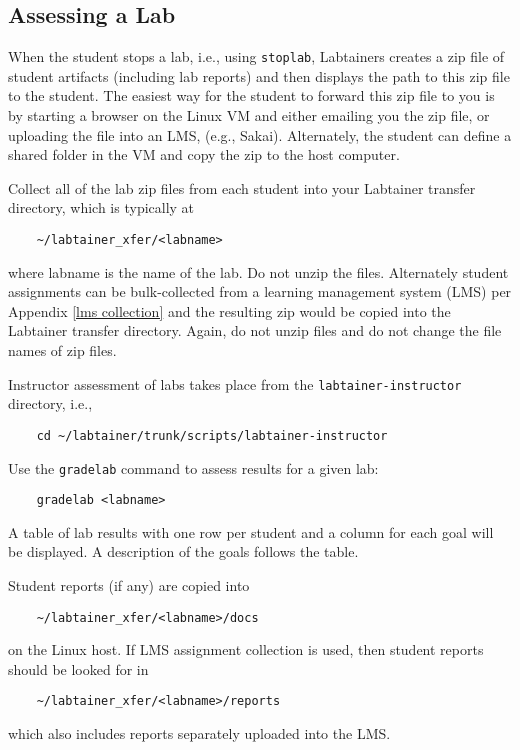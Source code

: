 \documentclass[12pt]{article}
\begin{document}
\subsection{Assessing a Lab}
When the student stops a lab, i.e., using {\tt stoplab}, Labtainers creates a zip file of
student artifacts (including lab reports) and then displays the path to this zip file to
the student.  The easiest way for the student to forward this zip file to you is by starting
a browser on the Linux VM and either emailing you the zip file, or uploading the file
into an LMS, (e.g., Sakai).  Alternately, the student can define a shared folder in the VM
and copy the zip to the host computer.

Collect all of the lab zip files from each student into your Labtainer transfer directory, which
is typically at
\begin{verbatim}
    ~/labtainer_xfer/<labname>
\end{verbatim}
\noindent where labname is the name of the lab.  Do not unzip the files.  Alternately student
assignments can be bulk-collected from a learning management system (LMS) per Appendix \ref{lms collection}
and the resulting zip  would be copied into the
Labtainer transfer directory.  Again, do not unzip files and do not change the file names of zip files.

Instructor assessment of labs takes place from the {\tt labtainer-instructor} directory, i.e.,
\begin{verbatim}
    cd ~/labtainer/trunk/scripts/labtainer-instructor
\end{verbatim}

\noindent Use the {\tt gradelab} command to assess results for a given lab:
\begin{verbatim}
    gradelab <labname>
\end{verbatim}
\noindent A table of lab results with one row per student and
a column for each goal will be displayed.  A description of the goals follows the table.

Student reports (if any) are  copied into 
\begin{verbatim}
    ~/labtainer_xfer/<labname>/docs
\end{verbatim}
\noindent on the Linux host.  If LMS assignment collection is used, then student reports should
be looked for in 
\begin{verbatim}
    ~/labtainer_xfer/<labname>/reports
\end{verbatim}
\noindent which also includes reports separately uploaded into the LMS.
\end{document}
